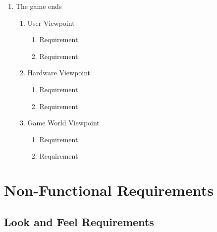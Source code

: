 \documentclass[]{article}
\begin{document}
\begin{enumerate}[{BE}1.]
\begin{enumerate}[{VP9}.1]
	\end{enumerate}
		\item The game ends
	\begin{enumerate}[{VP9}.1]
		\item User Viewpoint
			\begin{enumerate}
				\item Requirement
				\item Requirement
			\end{enumerate}
		\item Hardware Viewpoint
			\begin{enumerate}
				\item Requirement
				\item Requirement
			\end{enumerate}
		\item Game World Viewpoint
			\begin{enumerate}
				\item Requirement
				\item Requirement
			\end{enumerate}			
	\end{enumerate}
	
\end{enumerate}




\section{Non-Functional Requirements}
\label{sec:non-functional_requirements}

\newcommand{\holdEnum}{\setcounter{_enumi}{\value{enumi}}}
\newcommand{\resumeEnum}{\setcounter{enumi}{\value{_enumi}}}

\subsection{Look and Feel Requirements}
\label{sub:look_and_feel_requirements}
\end{document}
